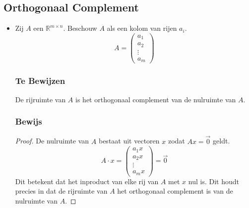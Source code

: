 \documentclass[lineaire_algebra_oplossingen.tex]{subfiles}
\begin{document}
\subsection*{Orthogonaal Complement}
\begin{itemize}
\item Zij $A$ een $\mathbb{R}^{m \times n}$. Beschouw $A$ als een kolom van rijen $a_i$.
\[
A = 
\begin{pmatrix}
a_1\\a_2\\\vdots\\a_m
\end{pmatrix}
\] 

\subsubsection*{Te Bewijzen}
De rijruimte van $A$ is het orthogonaal complement van de nulruimte van $A$.

\subsubsection*{Bewijs}
\begin{proof}
De nulruimte van $A$ bestaat uit vectoren $x$ zodat $Ax = \vec{0}$ geldt.
\[
A \cdot x = 
\begin{pmatrix}
a_1 x\\a_2 x\\\vdots\\a_m x  
\end{pmatrix}
=
\vec{0}
\]
Dit betekent dat het inproduct van elke rij van $A$ met $x$ nul is. Dit houdt precies in dat de rijruimte van $A$ het orthogonaal complement is van de nulruimte van $A$.
\end{proof}



\end{itemize}
\end{document}
